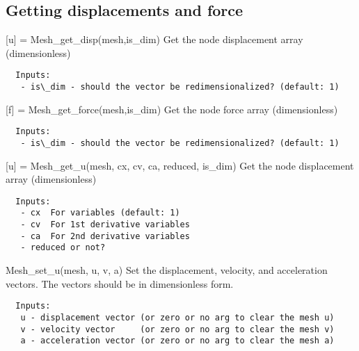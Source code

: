 \subsection{Getting displacements and force}
\begin{codelist}

  \item[{[u]} = Mesh\_get\_disp(mesh,is\_dim)]
  Get the node displacement array (dimensionless)
\begin{verbatim}
  Inputs:
   - is\_dim - should the vector be redimensionalized? (default: 1)
\end{verbatim}

  \item[{[f]} = Mesh\_get\_force(mesh,is\_dim)]
  Get the node force array (dimensionless)
\begin{verbatim}
  Inputs:
   - is\_dim - should the vector be redimensionalized? (default: 1)
\end{verbatim}

  \item[{[u]} = Mesh\_get\_u(mesh, cx, cv, ca, reduced, is\_dim)]
  Get the node displacement array (dimensionless)
\begin{verbatim}
  Inputs:
   - cx  For variables (default: 1)
   - cv  For 1st derivative variables
   - ca  For 2nd derivative variables
   - reduced or not?
\end{verbatim}

  \item[Mesh\_set\_u(mesh, u, v, a)]
  Set the displacement, velocity, and acceleration vectors.
  The vectors should be in dimensionless form.
\begin{verbatim}
  Inputs:
   u - displacement vector (or zero or no arg to clear the mesh u)
   v - velocity vector     (or zero or no arg to clear the mesh v)
   a - acceleration vector (or zero or no arg to clear the mesh a)
\end{verbatim}

\end{codelist}


